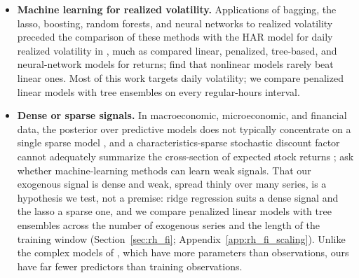 \begin{itemize}
  overnight returns removes important information. These studies forecast daily or session volatility; we carry the
  idea to the intraday interval by computing our predictors over the futures' full intraday grid, overnight
  intervals included (Section~\ref{sec:rh_predictors}).
\item \textbf{Machine learning for realized volatility.} Applications of bagging, the lasso, boosting, random
  forests, and neural networks to realized volatility \citep{HillebrandMedeiros2010,AudrinoKnaus2016,
  MittnikRobinzonovSpindler2015,LuongDokuchaev2018,RahimikiaPoon2020} preceded the comparison of these methods with
  the HAR model for daily realized volatility in \citet{christensen2023machine}, much as \citet{gu2020empirical}
  compared linear, penalized, tree-based, and neural-network models for returns; \citet{BrancoRubesamZevallos2024}
  find that nonlinear models rarely beat linear ones. Most of this work targets daily volatility; we compare
  penalized linear models with tree ensembles on every regular-hours interval.
\item \textbf{Dense or sparse signals.} In macroeconomic, microeconomic, and financial data, the posterior over
  predictive models does not typically concentrate on a single sparse model \citep{GiannoneLenzaPrimiceri2021}, and
  a characteristics-sparse stochastic discount factor cannot adequately summarize the cross-section of expected
  stock returns \citep{KozakNagelSantosh2020}; \citet{ShenXiu2025} ask whether machine-learning methods can learn
  weak signals. That our exogenous signal is dense and weak, spread thinly over many series, is a hypothesis we
  test, not a premise: ridge regression suits a dense signal and the lasso a sparse one, and we compare penalized
  linear models with tree ensembles across the number of exogenous series and the length of the training window
  (Section~\ref{sec:rh_fi}; Appendix~\ref{app:rh_fi_scaling}). Unlike the complex models of
  \citet{KellyMalamudZhou2024}, which have more parameters
  than observations, ours have far fewer predictors than training observations.

\end{itemize}
